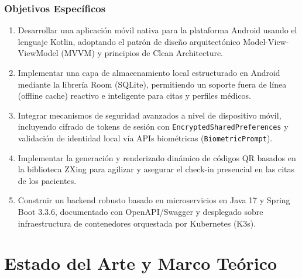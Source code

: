 \documentclass[12pt,a4paper]{report}
\begin{document}
\subsection{Objetivos Específicos}
\begin{enumerate}
    \item Desarrollar una aplicación móvil nativa para la plataforma Android usando el lenguaje Kotlin, adoptando el patrón de diseño arquitectónico Model-View-ViewModel (MVVM) y principios de Clean Architecture.
    \item Implementar una capa de almacenamiento local estructurado en Android mediante la librería Room (SQLite), permitiendo un soporte fuera de línea (offline cache) reactivo e inteligente para citas y perfiles médicos.
    \item Integrar mecanismos de seguridad avanzados a nivel de dispositivo móvil, incluyendo cifrado de tokens de sesión con \texttt{EncryptedSharedPreferences} y validación de identidad local vía APIs biométricas (\texttt{BiometricPrompt}).
    \item Implementar la generación y renderizado dinámico de códigos QR basados en la biblioteca ZXing para agilizar y asegurar el check-in presencial en las citas de los pacientes.
    \item Construir un backend robusto basado en microservicios en Java 17 y Spring Boot 3.3.6, documentado con OpenAPI/Swagger y desplegado sobre infraestructura de contenedores orquestada por Kubernetes (K3s).
\end{enumerate}

\newpage

\chapter{Estado del Arte y Marco Teórico}
\end{document}
